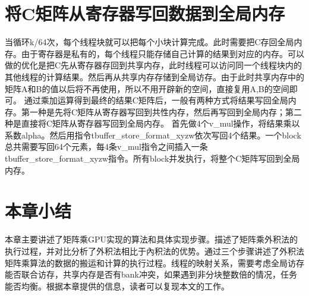 \section{将C矩阵从寄存器写回数据到全局内存}
当循环k/64次，每个线程块就可以把每个小块计算完成。此时需要把C存回全局内存。由于寄存器是私有的，每个线程只能存储自己计算的结果到对应的内存。可以做的优化是把C先从寄存器存回到共享内存，此时线程可以访问同一个线程块内的其他线程的计算结果。然后再从共享内存存储到全局访存。由于此时共享内存中的矩阵A和B的值以后将不再使用，所以不用开辟新的空间，直接复用A,B的空间即可。
通过乘加运算得到最终的结果C矩阵后，一般有两种方式将结果写回全局内存。第一种是先将C矩阵从寄存器写回到共性内存，然后再写回到全局内存；第二种是直接将C矩阵从寄存器写回到全局内存。
首先做4个v\_mul操作，将结果乘以系数alpha。然后用指令tbuffer\_store\_format\_xyzw依次写回4个结果。一个block总共需要写回64个元素，每4条v\_mul指令之间插入一条tbuffer\_store\_format\_xyzw指令。所有block并发执行，将整个C矩阵写回到全局内存。


\section{本章小结}
本章主要讲述了矩阵乘GPU实现的算法和具体实现步骤。描述了矩阵乘外积法的执行过程，并对比分析了外积法相比于內积法的优势。通过三个步骤讲述了外积法矩阵乘算法的数据的搬运和计算的执行过程。线程的映射关系，需要考虑全局访存能否联合访存，共享内存是否有bank冲突，如果遇到非分块整数倍的情况，任务能否均衡。根据本章提供的信息，读者可以复现本文的工作。
